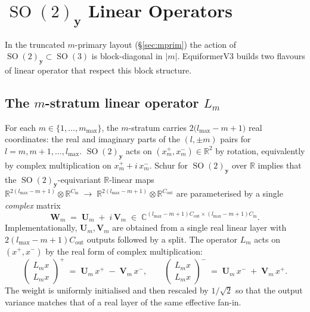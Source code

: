 \documentclass[11pt,a4paper]{article}
\DeclareMathOperator{\SO}{SO}
\newcommand{\R}{\mathbb{R}}
\newcommand{\C}{\mathbb{C}}
\newcommand{\bU}{\bm{U}}
\newcommand{\bV}{\bm{V}}
\newcommand{\by}{\bm{y}}
\newcommand{\bW}{\bm{W}}
\newcommand{\lmax}{l_{\max}}
\newcommand{\mmax}{m_{\max}}
\theoremstyle{plain}
\theoremstyle{definition}
\theoremstyle{remark}
\begin{document}
\section{\texorpdfstring{$\SO(2)_{\by}$ Linear Operators}{SO(2)\_y Linear Operators}}\label{sec:so2lin}

In the truncated $m$-primary layout (\S\ref{sec:mprim}) the action of
$\SO(2)_{\by}\subset\SO(3)$ is block-diagonal in $|m|$. EquiformerV3 builds two
flavours of linear operator that respect this block structure.

\subsection{\texorpdfstring{The $m$-stratum linear operator $L_m$}{The m-stratum linear operator L\_m}}\label{sec:Lm}

For each $m\in\{1,\dots,\mmax\}$, the $m$-stratum carries
$2\bigl(\lmax-m+1\bigr)$ real coordinates: the real and imaginary parts of the
$(l,\pm m)$ pairs for $l=m,m+1,\dots,\lmax$. $\SO(2)_{\by}$ acts on
$(x^+_m,x^-_m)\in\R^2$ by rotation, equivalently by complex multiplication on
$x^+_m+i\,x^-_m$. Schur for $\SO(2)_{\by}$ over $\R$ implies that the
$\SO(2)_{\by}$-equivariant $\R$-linear maps
$\R^{2(\lmax-m+1)}\otimes\R^{C_{\mathrm{in}}}\;\to\;\R^{2(\lmax-m+1)}\otimes\R^{C_{\mathrm{out}}}$
are parameterised by a single \emph{complex} matrix
\begin{equation}\label{eq:Lm-cmat}
    \bW_m\;=\;\bU_m\;+\;i\,\bV_m\;\in\;\C^{(\lmax-m+1)C_{\mathrm{out}}\times(\lmax-m+1)C_{\mathrm{in}}}.
\end{equation}
Implementationally, $\bU_m,\bV_m$ are obtained from a single real linear layer with $2(\lmax-m+1)C_{\mathrm{out}}$ outputs followed by a split.
The operator $L_m$ acts on $(x^+,x^-)$ by the real form of complex multiplication:
\begin{equation}\label{eq:Lm-action}
    \begin{pmatrix} L_m x \\[2pt] L_m x\end{pmatrix}^+ \;=\; \bU_m\,x^+\;-\;\bV_m\,x^-,\qquad
    \begin{pmatrix} L_m x \\[2pt] L_m x\end{pmatrix}^- \;=\; \bU_m\,x^-\;+\;\bV_m\,x^+.
\end{equation}
The weight is uniformly initialised and then rescaled by $1/\sqrt{2}$ so that the output variance matches that of a real layer of the same effective fan-in.
\end{document}
